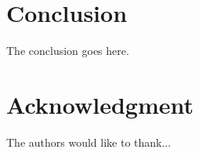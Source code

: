 \documentclass[conference]{IEEEtran}
\begin{document}
%





\section{Conclusion}
The conclusion goes here.






\section*{Acknowledgment}


The authors would like to thank...





\end{document}
